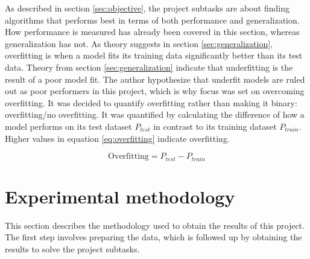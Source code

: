 	As described in section \ref{sec:objective}, the project subtasks are about finding algorithms that performs best in terms of both performance and generalization. How performance is measured has already been covered in this section, whereas generalization has not. As theory suggests in section  \ref{sec:generalization}, overfitting is when a model fits its training data significantly better than its test data. Theory from section \ref{sec:generalization} indicate that underfitting is the result of a poor model fit. The author hypothesize that underfit models are ruled out as poor performers in this project, which is why focus was set on overcoming overfitting. It was decided to quantify overfitting rather than making it binary: overfitting/no overfitting. It was quantified by calculating the difference of how a model performs on its test dataset $P_{test}$ in contrast to its training dataset $P_{train}$. Higher values in equation \ref{eq:overfitting} indicate overfitting.

	\begin{equation} \label{eq:overfitting}
		\mbox{Overfitting} = P_{test} - P_{train}
	\end{equation}
	

\section{Experimental methodology}
	This section describes the methodology used to obtain the results of this project. The first step involves preparing the data, which is followed up by obtaining the results to solve the project subtasks. 

